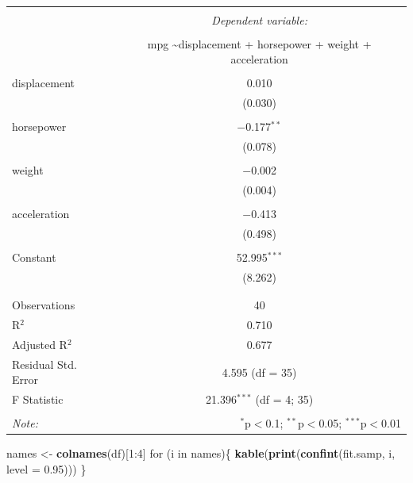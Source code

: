 \documentclass[]{article}
\newenvironment{Shaded}{\begin{snugshade}}{\end{snugshade}}
\newcommand{\KeywordTok}[1]{\textcolor[rgb]{0.13,0.29,0.53}{\textbf{{#1}}}}
\newcommand{\DataTypeTok}[1]{\textcolor[rgb]{0.13,0.29,0.53}{{#1}}}
\newcommand{\DecValTok}[1]{\textcolor[rgb]{0.00,0.00,0.81}{{#1}}}
\newcommand{\FloatTok}[1]{\textcolor[rgb]{0.00,0.00,0.81}{{#1}}}
\newcommand{\StringTok}[1]{\textcolor[rgb]{0.31,0.60,0.02}{{#1}}}
\newcommand{\NormalTok}[1]{{#1}}
\begin{document}
\begin{table}[!htbp] \centering 
  \caption{} 
  \label{} 
\begin{tabular}{@{\extracolsep{5pt}}lc} 
\\[-1.8ex]\hline 
\hline \\[-1.8ex] 
 & \multicolumn{1}{c}{\textit{Dependent variable:}} \\ 
\cline{2-2} 
\\[-1.8ex] & mpg \textasciitilde displacement + horsepower + weight + acceleration \\ 
\hline \\[-1.8ex] 
 displacement & 0.010 \\ 
  & (0.030) \\ 
  & \\ 
 horsepower & $-$0.177$^{**}$ \\ 
  & (0.078) \\ 
  & \\ 
 weight & $-$0.002 \\ 
  & (0.004) \\ 
  & \\ 
 acceleration & $-$0.413 \\ 
  & (0.498) \\ 
  & \\ 
 Constant & 52.995$^{***}$ \\ 
  & (8.262) \\ 
  & \\ 
\hline \\[-1.8ex] 
Observations & 40 \\ 
R$^{2}$ & 0.710 \\ 
Adjusted R$^{2}$ & 0.677 \\ 
Residual Std. Error & 4.595 (df = 35) \\ 
F Statistic & 21.396$^{***}$ (df = 4; 35) \\ 
\hline 
\hline \\[-1.8ex] 
\textit{Note:}  & \multicolumn{1}{r}{$^{*}$p$<$0.1; $^{**}$p$<$0.05; $^{***}$p$<$0.01} \\ 
\end{tabular} 
\end{table}

\begin{Shaded}
\begin{Highlighting}[]
\NormalTok{names <-}\StringTok{ }\KeywordTok{colnames}\NormalTok{(df)[}\DecValTok{1}\NormalTok{:}\DecValTok{4}\NormalTok{]}
\NormalTok{for (i in names)\{}
\KeywordTok{kable}\NormalTok{(}\KeywordTok{print}\NormalTok{(}\KeywordTok{confint}\NormalTok{(fit.samp, i, }\DataTypeTok{level =} \FloatTok{0.95}\NormalTok{)))}
\NormalTok{\}}
\end{Highlighting}
\end{Shaded}
\end{document}
